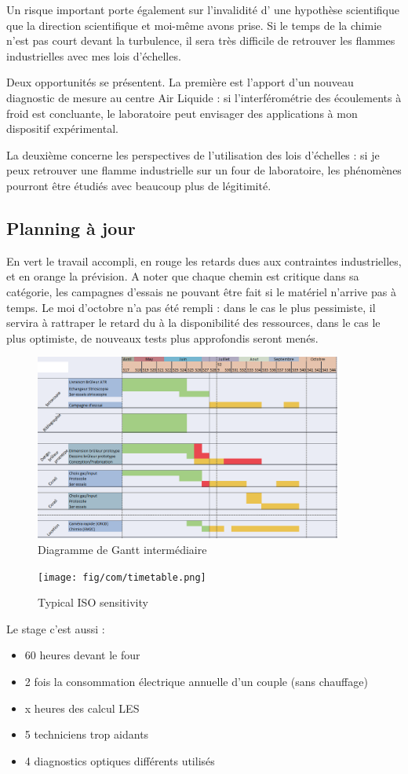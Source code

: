 Un risque important porte également sur l'invalidité d' une hypothèse scientifique que la direction scientifique et moi-même avons prise. Si le temps de la chimie n'est pas court devant la turbulence, il sera très difficile de retrouver les flammes industrielles avec mes lois d'échelles.

Deux opportunités se présentent. La première est l'apport d'un nouveau diagnostic de mesure au centre Air Liquide : si l'interférométrie des écoulements à froid est concluante, le laboratoire peut envisager des applications à mon dispositif expérimental.

La deuxième concerne les perspectives de l'utilisation des lois d'échelles : si je peux retrouver une flamme industrielle sur un four de laboratoire, les phénomènes pourront être étudiés avec beaucoup plus de légitimité.

\subsection{Planning à jour}

En vert le travail accompli, en rouge les retards dues aux contraintes industrielles, et en orange la prévision. A noter que chaque chemin est critique dans sa catégorie, les campagnes d'essais ne pouvant être fait si le matériel n'arrive pas à temps. Le moi d'octobre n'a pas été rempli : dans le cas le plus pessimiste, il servira à rattraper le retard du à la disponibilité des ressources, dans le cas le plus optimiste, de nouveaux tests plus approfondis seront menés.

\begin{figure}[!h]
  \centering
\includegraphics[width=0.9\textwidth]{fig/Gantt_Intermediaire.PNG}
  \caption{Diagramme de Gantt intermédiaire}
 \label{Gantt Int}
\end{figure}
\begin{figure}[!h]
  \centering
\texttt{[image: fig/com/timetable.png]}

  \caption{Typical ISO sensitivity}
 \label{fig_Iso_sensitivity_1D}
\end{figure}


Le stage c'est aussi :
\begin{itemize}
\item 60 heures devant le four
\item 2 fois la consommation électrique annuelle d'un couple (sans chauffage)
\item x heures des calcul LES
\item 5 techniciens trop aidants
\item 4 diagnostics optiques différents utilisés
\end{itemize}